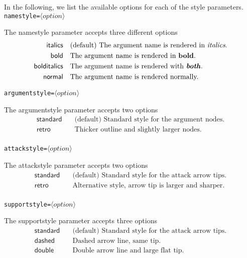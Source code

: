\documentclass{article}
\begin{document}
    In the following, we list the available options for each of the style parameters.\\

\noindent\texttt{namestyle=}$\langle option\rangle$
    
    The \textsf{namestyle} parameter accepts three different options
    \begin{align*}
        \mathsf{italics} &\quad \text{(default) The argument name is rendered in \emph{italics}.}\\
        \mathsf{bold} &\quad \text{The argument name is rendered in \textbf{bold}.}\\
        \mathsf{bolditalics} &\quad \text{The argument name is rendered with \textbf{\emph{both}}.}\\
        \mathsf{normal} &\quad \text{The argument name is rendered normally.}\\
    \end{align*}

\noindent\texttt{argumentstyle=}$\langle option\rangle$

    The \textsf{argumentstyle} parameter accepts two options
    \begin{align*}
        \mathsf{standard} &\quad \text{(default) Standard style for the argument nodes.}\\
        \mathsf{retro} &\quad \text{Thicker outline and slightly larger nodes.}\\
    \end{align*}

\noindent\texttt{attackstyle=}$\langle option\rangle$
    
    The \textsf{attackstyle} parameter accepts two options
    \begin{align*}
        \mathsf{standard} &\quad \text{(default) Standard style for the attack arrow tips.}\\
        \mathsf{retro} &\quad \text{Alternative style, arrow tip is larger and sharper.}\\
    \end{align*}

\noindent\texttt{supportstyle=}$\langle option\rangle$
    
    The \textsf{supportstyle} parameter accepts three options
    \begin{align*}
        \mathsf{standard} &\quad \text{(default) Standard style for the attack arrow tips.}\\
        \mathsf{dashed} &\quad \text{Dashed arrow line, same tip.}\\
        \mathsf{double} &\quad \text{Double arrow line and large flat tip.}\\
    \end{align*}
    
\end{document}
